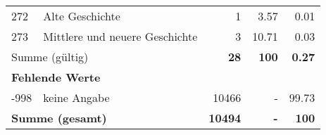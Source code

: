 \begin{longtable}{lXrrr}
     272 &
     \multicolumn{1}{X}{ Alte Geschichte   } &


       \num{1} &
       \num[round-mode=places,round-precision=2]{3.57} &
         \num[round-mode=places,round-precision=2]{0.01} \\

     273 &
     \multicolumn{1}{X}{ Mittlere und neuere Geschichte   } &


       \num{3} &
       \num[round-mode=places,round-precision=2]{10.71} &
         \num[round-mode=places,round-precision=2]{0.03} \\
     \midrule
     \multicolumn{2}{l}{Summe (gültig)} &
       \textbf{\num{28}} &
     \textbf{\num{100}} &
       \textbf{\num[round-mode=places,round-precision=2]{0.27}} \\
     \multicolumn{5}{l}{\textbf{Fehlende Werte}}\\
       -998 &
       keine Angabe &
         \num{10466} &
        - &
         \num[round-mode=places,round-precision=2]{99.73} \\
     \midrule
     \multicolumn{2}{l}{\textbf{Summe (gesamt)}} &
          \textbf{\num{10494}} &
        \textbf{-} &
        \textbf{\num{100}} \\
     \bottomrule
     \end{longtable}
     
